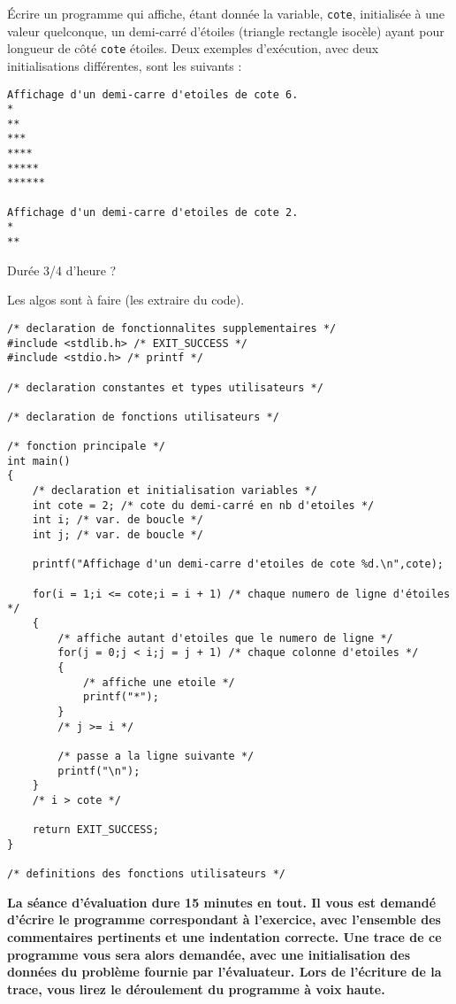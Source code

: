 Écrire un programme qui affiche, étant donnée la variable,
\verb|cote|, initialisée à une valeur quelconque, un demi-carré d'étoiles (triangle rectangle isocèle) ayant pour
longueur de côté \verb|cote| étoiles. Deux exemples d'exécution, avec deux initialisations
différentes, sont les suivants :
\begin{verbatim}
Affichage d'un demi-carre d'etoiles de cote 6.
*
**
***
****
*****
******

Affichage d'un demi-carre d'etoiles de cote 2.
*
**
\end{verbatim}

\begin{correction}
Durée 3/4 d'heure ?

Les algos sont à faire (les extraire du code).

\begin{verbatim}
/* declaration de fonctionnalites supplementaires */
#include <stdlib.h> /* EXIT_SUCCESS */
#include <stdio.h> /* printf */

/* declaration constantes et types utilisateurs */

/* declaration de fonctions utilisateurs */

/* fonction principale */
int main()
{
    /* declaration et initialisation variables */
    int cote = 2; /* cote du demi-carré en nb d'etoiles */
    int i; /* var. de boucle */
    int j; /* var. de boucle */

    printf("Affichage d'un demi-carre d'etoiles de cote %d.\n",cote);

    for(i = 1;i <= cote;i = i + 1) /* chaque numero de ligne d'étoiles */
    {
        /* affiche autant d'etoiles que le numero de ligne */
        for(j = 0;j < i;j = j + 1) /* chaque colonne d'etoiles */
        {
            /* affiche une etoile */
            printf("*");
        }
        /* j >= i */

        /* passe a la ligne suivante */
        printf("\n");
    }
    /* i > cote */

    return EXIT_SUCCESS;
}

/* definitions des fonctions utilisateurs */
\end{verbatim}
\end{correction}

\newpage
\textbf{La séance d'évaluation dure 15 minutes en tout. Il vous est demandé d'écrire le programme correspondant à l'exercice, avec l'ensemble des commentaires pertinents et une indentation correcte. Une trace de ce programme vous sera alors demandée, avec une initialisation des données du problème fournie par l'évaluateur. Lors de l'écriture de la trace, vous lirez le déroulement du programme à voix haute.}


